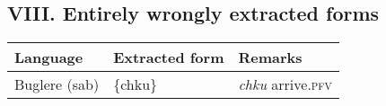 \subsection*{VIII. Entirely wrongly extracted forms}

{%
\setlength\tabcolsep{1.5pt}
\small
\begin{tabular}{L{.25\textwidth}L{.25\textwidth}L{.5\textwidth}}
\toprule
\bfseries Language & \bfseries Extracted form & \bfseries Remarks \\
\midrule
Buglere (sab)	& \{chku\}	& \textit{chku} arrive.\textsc{pfv}\\
\bottomrule
\end{tabular}
}%
